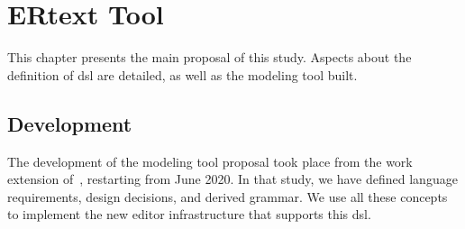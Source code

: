 \chapter{ERtext Tool} \label{chap:ERtext}

This chapter presents the main proposal of this study.
Aspects about the definition of \ac{dsl} are detailed, as well as the modeling tool built.

\section{Development} \label{sec_tool:development}

The development of the modeling tool proposal took place from the work extension of~\cite{Lopes:2019}, restarting from June 2020.
In that study, we have defined language requirements, design decisions, and derived grammar.
We use all these concepts to implement the new editor infrastructure that supports this \ac{dsl}.

